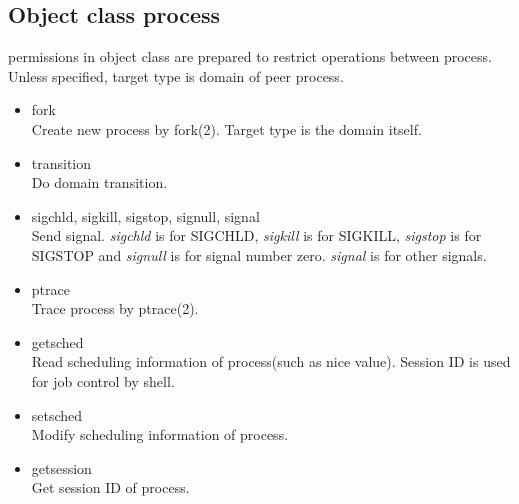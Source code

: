 \documentclass{article}
\begin{document}
\subsection{Object class process}
permissions in object class are prepared to restrict operations
between process. Unless specified, target type is domain of peer process.
\begin{itemize}
 \item fork\\
       Create new process by fork(2). Target type is the domain itself.
 \item transition\\
       Do domain transition.
 \item sigchld, sigkill, sigstop, signull, signal\\
       Send signal. {\it sigchld} is for SIGCHLD, {\it sigkill} is for SIGKILL,
      {\it  sigstop} is for SIGSTOP and  {\it signull} is for signal number
       zero. {\it signal } is for other signals.
 \item ptrace\\
       Trace process by ptrace(2).

 \item getsched\\
       Read scheduling information of process(such as nice
       value). Session ID is used for job control by shell.
 \item setsched\\
       Modify scheduling information of process.
 \item getsession\\
       Get session ID of process.


\end{itemize}
\end{document}
